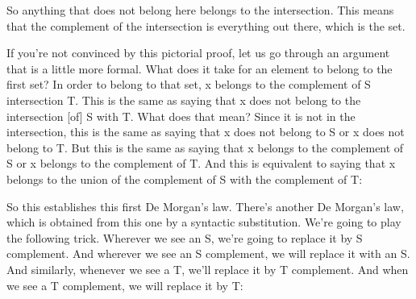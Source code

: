 \documentclass[pdftex, brazil, 12pt, twoside]{article}
\begin{document}
So anything that does not belong
here belongs to the intersection.
This means that the complement of the intersection is
everything out there, which is the set.

If you're not convinced by this pictorial proof, let us
go through an argument that is a little more formal.
What does it take for an element to belong
to the first set?
In order to belong to that set, x belongs to the
complement of S intersection T. This is the same as saying
that x does not belong to the intersection [of]
S with T.
What does that mean?
Since it is not in the intersection, this is the same
as saying that x does not belong to S or x does not
belong to T. But this is the same as saying that x belongs
to the complement of S or x belongs to the complement of
T. And this is equivalent to saying that x belongs to the
union of the complement of S with the complement of T:

\begin{figure}[H]
  \begin{center}
  \end{center}
\end{figure}

So this establishes this first De Morgan's law.
There's another De Morgan's law, which is obtained from
this one by a syntactic substitution.
We're going to play the following trick.
Wherever we see an S, we're going to replace it by S
complement.
And wherever we see an S complement, we will replace it
with an S.
And similarly, whenever we see a T, we'll replace it by T
complement.
And when we see a T complement, we will replace it
by T:

\begin{figure}[H]
  \begin{center}
  \end{center}
\end{figure}
\end{document}
